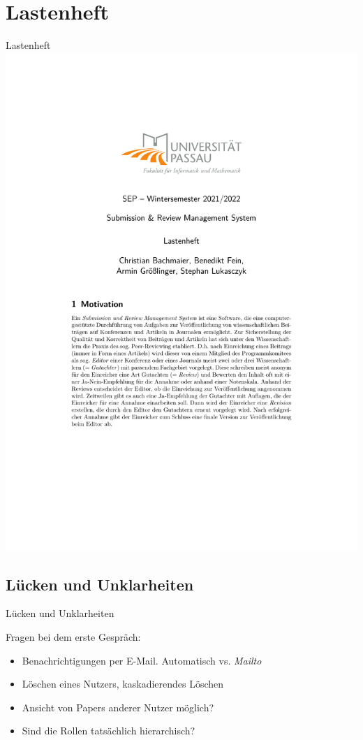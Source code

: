 \documentclass{beamer}
\begin{document}
\section{Lastenheft}
\begin{frame}{Lastenheft}
	\centering
	\includegraphics[height=1.1\textheight]{../../docs/Lastenheft/lastenheft}
\end{frame}


\subsection{Lücken und Unklarheiten}
\begin{frame}{Lücken und Unklarheiten}

	Fragen bei dem erste Gespräch:
	\pause

	\begin{itemize}
		\item Benachrichtigungen per E-Mail. Automatisch vs. \emph{Mailto}
		\pause
		\item Löschen eines Nutzers, kaskadierendes Löschen
		\pause
		\item Ansicht von Papers anderer Nutzer möglich?
		\pause
		\item Sind die Rollen tatsächlich hierarchisch?
	\end{itemize}

\end{frame}
\end{document}
